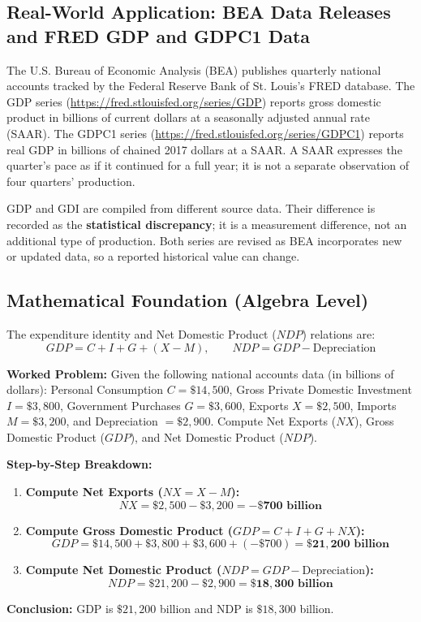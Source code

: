 \documentclass[11pt,letterpaper]{article}
\begin{document}
\subsection*{Real-World Application: BEA Data Releases and FRED GDP and GDPC1 Data}
The U.S. Bureau of Economic Analysis (BEA) publishes quarterly national accounts tracked by the Federal Reserve Bank of St. Louis's FRED database. The GDP series (\url{https://fred.stlouisfed.org/series/GDP}) reports gross domestic product in billions of current dollars at a seasonally adjusted annual rate (SAAR). The GDPC1 series (\url{https://fred.stlouisfed.org/series/GDPC1}) reports real GDP in billions of chained 2017 dollars at a SAAR. A SAAR expresses the quarter's pace as if it continued for a full year; it is not a separate observation of four quarters' production.

GDP and GDI are compiled from different source data. Their difference is recorded as the \textbf{statistical discrepancy}; it is a measurement difference, not an additional type of production. Both series are revised as BEA incorporates new or updated data, so a reported historical value can change.

\subsection*{Mathematical Foundation (Algebra Level)}
The expenditure identity and Net Domestic Product ($NDP$) relations are:
\begin{equation}
GDP = C + I + G + (X - M), \qquad NDP = GDP - \text{Depreciation}
\end{equation}

\noindent\textbf{Worked Problem:}
Given the following national accounts data (in billions of dollars): Personal Consumption $C = \$14{,}500$, Gross Private Domestic Investment $I = \$3{,}800$, Government Purchases $G = \$3{,}600$, Exports $X = \$2{,}500$, Imports $M = \$3{,}200$, and Depreciation $= \$2{,}900$. Compute Net Exports ($NX$), Gross Domestic Product ($GDP$), and Net Domestic Product ($NDP$).

\noindent\textbf{Step-by-Step Breakdown:}
\begin{enumerate}
    \item \textbf{Compute Net Exports ($NX = X - M$):}
    \[
    NX = \$2{,}500 - \$3{,}200 = \mathbf{-\$700\text{ billion}}
    \]

    \item \textbf{Compute Gross Domestic Product ($GDP = C + I + G + NX$):}
    \[
    GDP = \$14{,}500 + \$3{,}800 + \$3{,}600 + (-\$700) = \mathbf{\$21{,}200\text{ billion}}
    \]

    \item \textbf{Compute Net Domestic Product ($NDP = GDP - \text{Depreciation}$):}
    \[
    NDP = \$21{,}200 - \$2{,}900 = \mathbf{\$18{,}300\text{ billion}}
    \]
\end{enumerate}
\textbf{Conclusion:} GDP is $\$21{,}200$ billion and NDP is $\$18{,}300$ billion.
\end{document}
